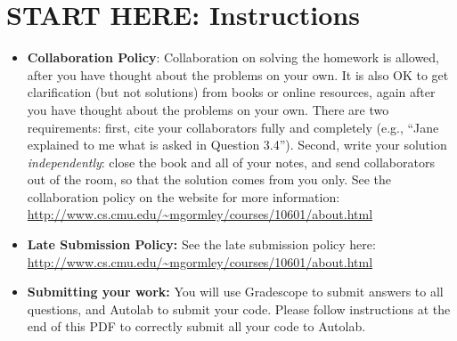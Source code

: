 \documentclass[11pt]{exam}
\numberwithin{equation}{section} %
\numberwithin{figure}{section} %
\numberwithin{table}{section} %
\begin{document}
\section*{START HERE: Instructions}
\begin{itemize}

\item \textbf{Collaboration Policy}: Collaboration on solving the homework is allowed, after you have thought about the problems on your own. It is also OK to get clarification (but not solutions) from books or online resources, again after you have thought about the problems on your own. There are two requirements: first, cite your collaborators fully and completely (e.g., ``Jane explained to me what is asked in Question 3.4''). Second, write your solution {\em independently}: close the book and all of your notes, and send collaborators out of the room, so that the solution comes from you only.  See the collaboration policy on the website for more information: \url{http://www.cs.cmu.edu/~mgormley/courses/10601/about.html}
\item\textbf{Late Submission Policy:} See the late submission policy
  here:
  \url{http://www.cs.cmu.edu/~mgormley/courses/10601/about.html}

\item\textbf{Submitting your work:} You will use Gradescope to submit
  answers to all questions, and Autolab to submit your code. Please
  follow instructions at the end of this PDF to correctly submit all your code to Autolab.

  \begin{itemize}
    

    

\end{itemize}
\end{itemize}
\end{document}
